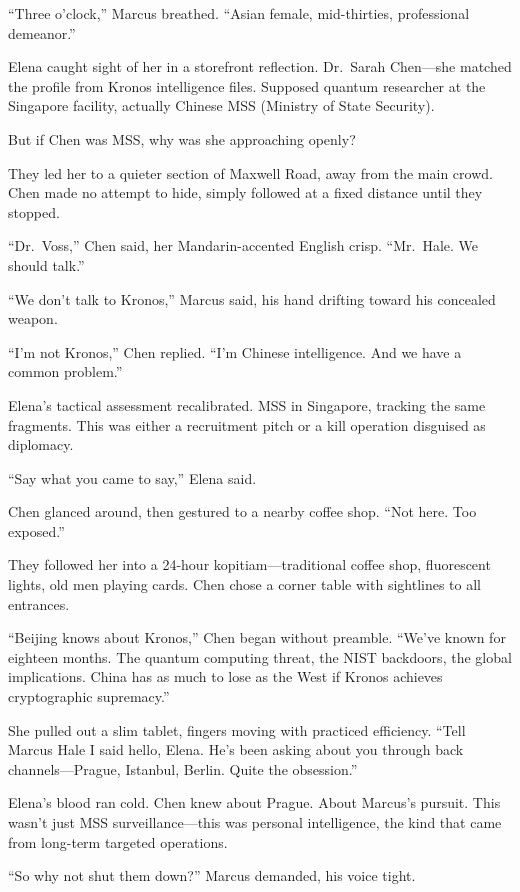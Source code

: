 \documentclass[12pt,letterpaper]{book}
\begin{document}
``Three o'clock,'' Marcus breathed. ``Asian female, mid-thirties, professional demeanor.''

Elena caught sight of her in a storefront reflection. Dr.~Sarah Chen---she matched the profile from Kronos intelligence files. Supposed quantum researcher at the Singapore facility, actually Chinese MSS (Ministry of State Security).

But if Chen was MSS, why was she approaching openly?

They led her to a quieter section of Maxwell Road, away from the main crowd. Chen made no attempt to hide, simply followed at a fixed distance until they stopped.

``Dr.~Voss,'' Chen said, her Mandarin-accented English crisp. ``Mr.~Hale. We should talk.''

``We don't talk to Kronos,'' Marcus said, his hand drifting toward his concealed weapon.

``I'm not Kronos,'' Chen replied. ``I'm Chinese intelligence. And we have a common problem.''

Elena's tactical assessment recalibrated. MSS in Singapore, tracking the same fragments. This was either a recruitment pitch or a kill operation disguised as diplomacy.

``Say what you came to say,'' Elena said.

Chen glanced around, then gestured to a nearby coffee shop. ``Not here. Too exposed.''

They followed her into a 24-hour kopitiam---traditional coffee shop, fluorescent lights, old men playing cards. Chen chose a corner table with sightlines to all entrances.

``Beijing knows about Kronos,'' Chen began without preamble. ``We've known for eighteen months. The quantum computing threat, the NIST backdoors, the global implications. China has as much to lose as the West if Kronos achieves cryptographic supremacy.''

She pulled out a slim tablet, fingers moving with practiced efficiency. ``Tell Marcus Hale I said hello, Elena. He's been asking about you through back channels---Prague, Istanbul, Berlin. Quite the obsession.''

Elena's blood ran cold. Chen knew about Prague. About Marcus's pursuit. This wasn't just MSS surveillance---this was personal intelligence, the kind that came from long-term targeted operations.

``So why not shut them down?'' Marcus demanded, his voice tight.
\end{document}
